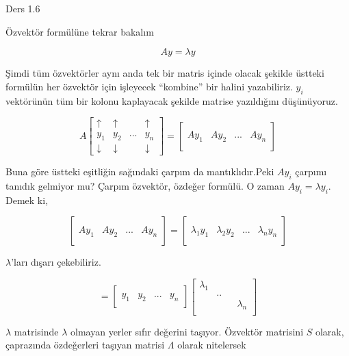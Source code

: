 \documentclass[12pt,fleqn]{article}\usepackage{../../common}
\begin{document}
Ders 1.6

Özvektör formülüne tekrar bakalım

$$ Ay = \lambda y $$

Şimdi tüm özvektörler aynı anda tek bir matris içinde olacak şekilde
üstteki formülün her özvektör için işleyecek ``kombine'' bir halini
yazabiliriz. $y_i$ vektörünün tüm bir kolonu kaplayacak şekilde matrise
yazıldığını düşünüyoruz. 

$$ 
A 
\left[\begin{array}{cccc}
\uparrow & \uparrow &  & \uparrow \\
y_1 & y_2 & ... & y_n \\
\downarrow & \downarrow &  & \downarrow 
\end{array}\right]
= 
\left[\begin{array}{cccc}
&&& \\
Ay_1 & Ay_2 & ... & Ay_n \\
&&& 
\end{array}\right]
$$

Buna göre üstteki eşitliğin sağındaki çarpım da mantıklıdır.Peki $Ay_i$
çarpımı tanıdık gelmiyor mu? Çarpım özvektör, özdeğer formülü. O zaman
$Ay_i = \lambda y_i$. Demek ki,

$$ 
\left[\begin{array}{cccc}
&&& \\
Ay_1 & Ay_2 & ... & Ay_n \\
&&& 
\end{array}\right]
= 
\left[\begin{array}{cccc}
&&& \\
\lambda_1y_1 & \lambda_2y_2 & ... & \lambda_ny_n \\
&&& 
\end{array}\right]
 $$

$\lambda$'ları dışarı çekebiliriz. 

$$ 
= \left[\begin{array}{cccc}
&&& \\
y_1 & y_2 & ... & y_n \\
&&& 
\end{array}\right]
\left[\begin{array}{cccc}
\lambda_1 &&& \\
& .. && \\
&&& \lambda_n \\
\end{array}\right]
 $$

$\lambda$ matrisinde $\lambda$ olmayan yerler sıfır değerini
taşıyor. Özvektör matrisini $S$ olarak, çaprazında özdeğerleri taşıyan
matrisi $\Lambda$ olarak nitelersek
\end{document}
